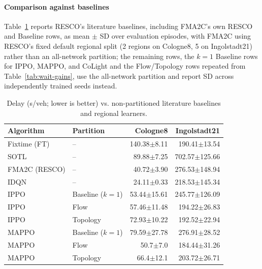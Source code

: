 \documentclass[journal]{IEEEtran}
\theoremstyle{definition}
\begin{document}
\paragraph{Comparison against baselines}

Table~\ref{tab:baselines} reports RESCO's literature baselines, including FMA2C's own RESCO and Baseline rows, as mean $\pm$ SD over evaluation episodes, with FMA2C using RESCO's fixed default regional split (2 regions on Cologne8, 5 on Ingolstadt21) rather than an all-network partition; the remaining rows, the $k{=}1$ Baseline rows for IPPO, MAPPO, and CoLight and the Flow/Topology rows repeated from Table~\ref{tab:wait-gains}, use the all-network partition and report SD across independently trained seeds instead.

\begin{table}[t]
    \centering
    \caption{Delay (s/veh; lower is better) vs. non-partitioned literature baselines and regional learners.}
    \label{tab:baselines}
    \scriptsize
    \setlength{\tabcolsep}{4pt}
    \begin{tabular}{llrr}
        \toprule
        Algorithm     & Partition                & Cologne8        & Ingolstadt21      \\
        \midrule
        Fixtime (FT)  & --                       & 140.38$\pm$8.11 & 190.41$\pm$13.54  \\
        SOTL          & --                       & 89.88$\pm$7.25  & 702.57$\pm$125.66 \\
        FMA2C (RESCO) & --                       & 40.72$\pm$3.90  & 276.53$\pm$148.94 \\
        IDQN          & --                       & 24.11$\pm$0.33  & 218.53$\pm$145.34 \\
        \addlinespace
        IPPO          & Baseline ($k{=}1$)       & 53.44$\pm$15.61 & 245.77$\pm$126.09 \\
        IPPO          & Flow                     & 57.46$\pm$11.48 & 194.22$\pm$26.83  \\
        IPPO          & Topology                 & 72.93$\pm$10.22 & 192.52$\pm$22.94  \\
        \addlinespace
        MAPPO         & Baseline ($k{=}1$)       & 79.59$\pm$27.78 & 276.91$\pm$28.52  \\
        MAPPO         & Flow                     & 50.7$\pm$7.0    & 184.44$\pm$31.26  \\
        MAPPO         & Topology                 & 66.4$\pm$12.1   & 203.72$\pm$26.71  \\

\end{tabular}
\end{table}
\end{document}
